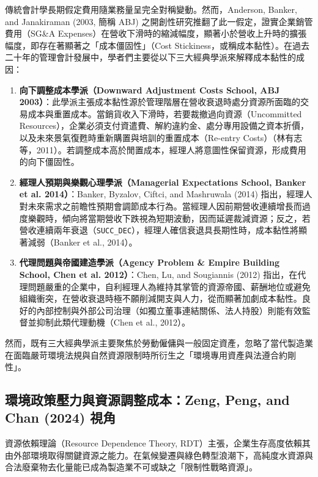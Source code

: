 \documentclass[12pt,a4paper]{article}
\begin{document}
傳統會計學長期假定費用隨業務量呈完全對稱變動。然而，Anderson, Banker, and Janakiraman (2003, 簡稱 ABJ) 之開創性研究推翻了此一假定，證實企業銷管費用（SG\&A Expenses）在營收下滑時的縮減幅度，顯著小於營收上升時的擴張幅度，即存在著顯著之「成本僵固性」（Cost Stickiness，或稱成本黏性）。在過去二十年的管理會計發展中，學者們主要從以下三大經典學派來解釋成本黏性的成因：

\begin{enumerate}[leftmargin=*]
    \item \textbf{向下調整成本學派（Downward Adjustment Costs School, ABJ 2003）}：此學派主張成本黏性源於管理階層在營收衰退時處分資源所面臨的交易成本與重置成本。當銷貨收入下滑時，若要裁撤過向資源（Uncommitted Resources），企業必須支付資遣費、解約違約金、處分專用設備之資本折價，以及未來景氣復甦時重新購置與培訓的重置成本（Re-entry Costs）（林有志等，2011）。若調整成本高於閒置成本，經理人將意圖性保留資源，形成費用的向下僵固性。
    \item \textbf{經理人預期與樂觀心理學派（Managerial Expectations School, Banker et al. 2014）}：Banker, Byzalov, Ciftci, and Mashruwala (2014) 指出，經理人對未來需求之前瞻性預期會調節成本行為。當經理人因前期營收連續增長而過度樂觀時，傾向將當期營收下跌視為短期波動，因而延遲裁減資源；反之，若營收連續兩年衰退（\texttt{SUCC\_DEC}），經理人確信衰退具長期性時，成本黏性將顯著減弱（Banker et al., 2014）。
    \item \textbf{代理問題與帝國建造學派（Agency Problem \& Empire Building School, Chen et al. 2012）}：Chen, Lu, and Sougiannis (2012) 指出，在代理問題嚴重的企業中，自利經理人為維持其掌管的資源帝國、薪酬地位或避免組織衝突，在營收衰退時極不願削減開支與人力，從而顯著加劇成本黏性。良好的內部控制與外部公司治理（如獨立董事連結關係、法人持股）則能有效監督並抑制此類代理動機（Chen et al., 2012）。
\end{enumerate}

然而，既有三大經典學派主要聚焦於勞動僱傭與一般固定資產，忽略了當代製造業在面臨嚴苛環境法規與自然資源限制時所衍生之「環境專用資產與法遵合約剛性」。

\subsection{環境政策壓力與資源調整成本：Zeng, Peng, and Chan (2024) 視角}

資源依賴理論（Resource Dependence Theory, RDT）主張，企業生存高度依賴其由外部環境取得關鍵資源之能力。在氣候變遷與綠色轉型浪潮下，高純度水資源與合法廢棄物去化量能已成為製造業不可或缺之「限制性戰略資源」。
\end{document}
